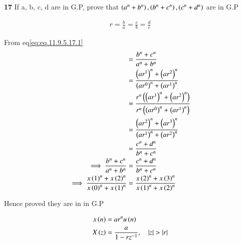 \documentclass[journal,12pt,twocolumn]{IEEEtran}
\theoremstyle{remark}
\begin{document}


\vspace{3cm}

\title{}
\author{EE23BTECH11047 - Deepakreddy P
}
\maketitle
\newpage
\bigskip

\noindent \textbf{17} \quad 
If a, b, c, d are in G.P, prove that 
$ \left(a^{n} + b^{n}\right),\left(b^{n} + c^{n}\right),\left(c^{n} + d^{n}\right) $ are in G.P \\
\solution

\begin{center}
    \begin{table}[ht]
        
    \end{table}
\end{center}


\begin{align}   
r=\frac{b}{a} = \frac{c}{b}= \frac{d}{c} \label{eq:eq.11.9.5.17.1}
\end{align}


From eq\eqref{eq:eq.11.9.5.17.1}\\

\begin{align}
&= \frac{b^n + c^n}{a^n + b^n}\\
&= \frac{\left(ar^1\right)^n + \left(ar^2\right)^n}{\left(ar^0\right)^n + \left(ar^1\right)^n}\\
&= \frac{r^n \left(\left(ar^1\right)^n + \left(ar^2\right)^n\right)}{r^n \left(\left(ar^0\right)^n + \left(ar^1\right)^n\right)}\\
&= \frac{\left(ar^2\right)^n + \left(ar^3\right)^n}{\left(ar^1\right)^n + \left(ar^2\right)^n}\\
&= \frac{c^n + d^n}{b^n + c^n}\\
\implies \frac{b^n + c^n}{a^n + b^n} &= \frac{c^n + d^n}{b^n + c^n}\\
\implies \frac{x\left(1\right)^n + x\left(2\right)^n }{x\left(0\right)^n + x\left(1\right)^n} &= \frac{x\left(2\right)^n + x\left(3\right)^n}{x\left(1\right)^n + x\left(2\right)^n}\\
\end{align}

Hence proved they are in in G.P

\begin{align}
    x\brak{n} &= ar^{n} u\brak{n}\\
    X\brak{z} &= \frac{a}{1-rz^{-1}}, \quad |z|>|r|
\end{align}
\end{document}
